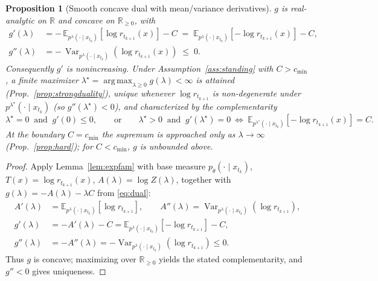 \documentclass{article}
\newtheorem{proposition}{Proposition}
\DeclareMathOperator{\Var}{Var}
\DeclareMathOperator*{\argmax}{arg\,max}
\newcommand{\E}{\mathbb{E}}
\newcommand{\R}{\mathbb{R}}
\newcommand{\lstar}{\lambda^{\star}}
\newcommand{\qlam}{p^{\lambda}(\cdot\mid x_{t_k})}
\begin{document}
\begin{proposition}[Smooth concave dual with mean/variance derivatives]
\label{prop:dual}
$g$ is real-analytic on $\R$ and concave on $\R_{\ge0}$, with
\begin{align}
g'(\lambda) &= -\,\E_{\qlam}\!\left[\log r_{t_{k+1}}(x)\right]-C
           \;=\;\E_{\qlam}\!\left[-\log r_{t_{k+1}}(x)\right]-C,
\label{eq:gprime}\\
g''(\lambda) &= -\,\Var_{\qlam}\!\left(\log r_{t_{k+1}}(x)\right)\;\le\;0.
\label{eq:gsecond}
\end{align}
Consequently $g'$ is nonincreasing. Under Assumption~\ref{ass:standing} with $C>c_{\min}$, a \emph{finite} maximizer $\lstar=\argmax_{\lambda\ge0}g(\lambda)<\infty$ is attained (Prop.~\ref{prop:strongduality}), unique whenever $\log r_{t_{k+1}}$ is non-degenerate under $p^{\lstar}(\cdot\mid x_{t_k})$ (so $g''(\lstar)<0$), and characterized by the complementarity
\begin{equation}
\lstar=0 \ \text{ and }\ g'(0)\le 0,
\qquad\text{or}\qquad
\lstar>0 \ \text{ and }\ g'(\lstar)=0\ \Leftrightarrow\ \E_{p^{\lstar}(\cdot\mid x_{t_k})}[-\log r_{t_{k+1}}(x)]=C.
\end{equation}
At the boundary $C=c_{\min}$ the supremum is approached only as $\lambda\to\infty$ (Prop.~\ref{prop:hard}); for $C<c_{\min}$, $g$ is unbounded above.
\end{proposition}
\begin{proof}
Apply Lemma~\ref{lem:expfam} with base measure $p_\theta(\cdot\mid x_{t_k})$, $T(x)=\log r_{t_{k+1}}(x)$, $A(\lambda)=\log Z(\lambda)$, together with $g(\lambda)=-A(\lambda)-\lambda C$ from \eqref{eq:dual}:
\begin{align*}
A'(\lambda)&=\E_{\qlam}[\log r_{t_{k+1}}],\qquad A''(\lambda)=\Var_{\qlam}(\log r_{t_{k+1}}),\\
g'(\lambda)&=-A'(\lambda)-C=\E_{\qlam}[-\log r_{t_{k+1}}]-C,\\
g''(\lambda)&=-A''(\lambda)=-\Var_{\qlam}(\log r_{t_{k+1}})\le0.
\end{align*}
Thus $g$ is concave; maximizing over $\R_{\ge0}$ yields the stated complementarity, and $g''<0$ gives uniqueness.
\end{proof}
\end{document}
